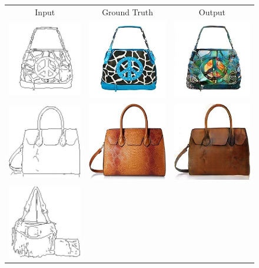 \begin{figure}[t]
    \centering
    \begin{tabular}{ccc}
    Input & Ground Truth & Output \\
    \includegraphics[width=.15\linewidth]{images/handbags_edges_lotsofresults_latex/input_106_AB.jpg} &
    \includegraphics[width=.15\linewidth]{images/handbags_edges_lotsofresults_latex/gt_106_AB.jpg} &
    \includegraphics[width=.15\linewidth]{images/handbags_edges_lotsofresults_latex/L1cGAN_106_AB.jpg} \\
    \includegraphics[width=.15\linewidth]{images/handbags_edges_lotsofresults_latex/input_12_AB.jpg} &
    \includegraphics[width=.15\linewidth]{images/handbags_edges_lotsofresults_latex/gt_12_AB.jpg} &
    \includegraphics[width=.15\linewidth]{images/handbags_edges_lotsofresults_latex/L1cGAN_12_AB.jpg} \\
    \includegraphics[width=.15\linewidth]{images/handbags_edges_lotsofresults_latex/input_130_AB.jpg} &

\end{tabular}
\end{figure}
